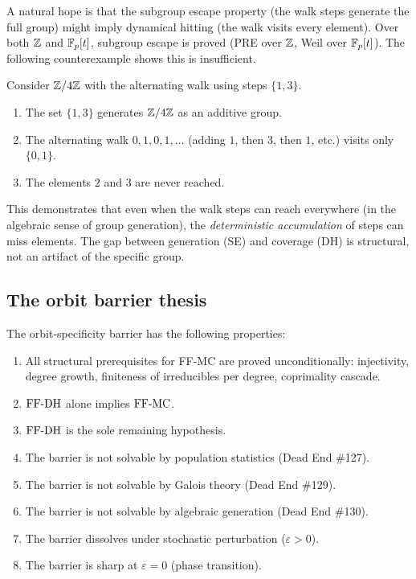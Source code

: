 A natural hope is that the subgroup escape property (the walk steps
generate the full group) might imply dynamical hitting (the walk visits
every element). Over both $\mathbb{Z}$ and $\mathbb{F}_p[t]$, subgroup escape is proved
(PRE over $\mathbb{Z}$, Weil over $\mathbb{F}_p[t]$). The following counterexample shows
this is insufficient.

\begin{theorem}\label{thm:de130}
Consider $\mathbb{Z}/4\mathbb{Z}$ with the alternating walk using steps $\{1, 3\}$.
\begin{enumerate}[label=(\roman*)]
  \item The set $\{1, 3\}$ generates $\mathbb{Z}/4\mathbb{Z}$ as an additive group.
  \item The alternating walk $0, 1, 0, 1, \ldots$ (adding $1$, then $3$,
    then $1$, etc.) visits only $\{0, 1\}$.
  \item The elements $2$ and $3$ are never reached.
\end{enumerate}
\end{theorem}

This demonstrates that even when the walk steps can reach everywhere (in the
algebraic sense of group generation), the \emph{deterministic accumulation}
of steps can miss elements. The gap between generation (SE) and coverage
(DH) is structural, not an artifact of the specific group.

\subsection{The orbit barrier thesis}

\begin{theorem}\label{thm:barrier-thesis}
The orbit-specificity barrier has the following properties:
\begin{enumerate}[label=(\roman*)]
  \item All structural prerequisites for FF-MC are proved unconditionally:
    injectivity, degree growth, finiteness of irreducibles per degree,
    coprimality cascade.
  \item $\mathrm{FF\text{-}DH}$ alone implies $\mathrm{FF\text{-}MC}$.
  \item $\mathrm{FF\text{-}DH}$ is the sole remaining hypothesis.
  \item The barrier is not solvable by population statistics (Dead End \#127).
  \item The barrier is not solvable by Galois theory (Dead End \#129).
  \item The barrier is not solvable by algebraic generation (Dead End \#130).
  \item The barrier dissolves under stochastic perturbation ($\varepsilon > 0$).
  \item The barrier is sharp at $\varepsilon = 0$ (phase transition).
\end{enumerate}
\end{theorem}

